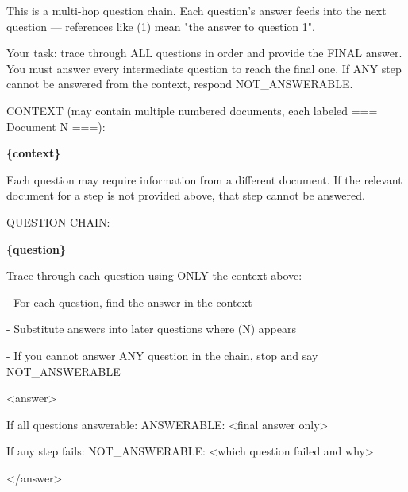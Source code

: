 \begin{tcolorbox}[colback=white, colframe=my-green, coltitle=black, parskip=5mm, title=\textbf{Chain Verification}, halign=flush left, enhanced, breakable, skin first=enhanced, skin middle=enhanced, skin last=enhanced]
\begin{scriptsize}
\ttfamily
\setlength{\parindent}{0pt}
\mbox{}\par
This is a multi-hop question chain. Each question's answer feeds into the next question — references like (1) mean "the answer to question 1".\par
\mbox{}\par
Your task: trace through ALL questions in order and provide the FINAL answer. You must answer every intermediate question to reach the final one. If ANY step cannot be answered from the context, respond NOT\_ANSWERABLE.\par
\mbox{}\par
CONTEXT (may contain multiple numbered documents, each labeled === Document N ===):\par
\textcolor{my-green}{\textbf{\{context\}}}\par
\mbox{}\par
Each question may require information from a different document. If the relevant document for a step is not provided above, that step cannot be answered.\par
\mbox{}\par
QUESTION CHAIN:\par
\textcolor{my-green}{\textbf{\{question\}}}\par
\mbox{}\par
Trace through each question using ONLY the context above:\par
- For each question, find the answer in the context\par
- Substitute answers into later questions where (N) appears\par
- If you cannot answer ANY question in the chain, stop and say NOT\_ANSWERABLE\par
\mbox{}\par
\textless{}answer\textgreater{}\par
If all questions answerable: ANSWERABLE: \textless{}final answer only\textgreater{}\par
If any step fails: NOT\_ANSWERABLE: \textless{}which question failed and why\textgreater{}\par
\textless{}/answer\textgreater{}\par
\end{scriptsize}
\end{tcolorbox}

